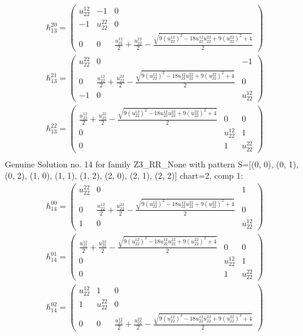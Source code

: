 \documentclass[a4paper, 11pt, twoside, onecolumn]{article}
\begin{document}
\begin{landscape}
\begin{gather*}
	 h_13^{20}=\begin{pmatrix}u^{12}_{22} & -1 & 0\\-1 & u^{22}_{22} & 0\\0 & 0 & \frac{u^{12}_{22}}{2} + \frac{u^{22}_{22}}{2} - \frac{\sqrt{9 \left(u^{12}_{22}\right)^{2} - 18 u^{12}_{22} u^{22}_{22} + 9 \left(u^{22}_{22}\right)^{2} + 4}}{2}\end{pmatrix}\\ 
	 h_13^{21}=\begin{pmatrix}u^{22}_{22} & 0 & -1\\0 & \frac{u^{12}_{22}}{2} + \frac{u^{22}_{22}}{2} - \frac{\sqrt{9 \left(u^{12}_{22}\right)^{2} - 18 u^{12}_{22} u^{22}_{22} + 9 \left(u^{22}_{22}\right)^{2} + 4}}{2} & 0\\-1 & 0 & u^{12}_{22}\end{pmatrix}\\ 
	 h_13^{22}=\begin{pmatrix}\frac{u^{12}_{22}}{2} + \frac{u^{22}_{22}}{2} - \frac{\sqrt{9 \left(u^{12}_{22}\right)^{2} - 18 u^{12}_{22} u^{22}_{22} + 9 \left(u^{22}_{22}\right)^{2} + 4}}{2} & 0 & 0\\0 & u^{12}_{22} & 1\\0 & 1 & u^{22}_{22}\end{pmatrix}\\ 
\end{gather*} 
Genuine Solution no. 14 for family Z3_RR_None with pattern S=[(0, 0), (0, 1), (0, 2), (1, 0), (1, 1), (1, 2), (2, 0), (2, 1), (2, 2)] chart=2, comp 1: 
\begin{gather*} 
	 h_14^{00}=\begin{pmatrix}u^{22}_{22} & 0 & 1\\0 & \frac{u^{12}_{22}}{2} + \frac{u^{22}_{22}}{2} - \frac{\sqrt{9 \left(u^{12}_{22}\right)^{2} - 18 u^{12}_{22} u^{22}_{22} + 9 \left(u^{22}_{22}\right)^{2} + 4}}{2} & 0\\1 & 0 & u^{12}_{22}\end{pmatrix}\\ 
	 h_14^{01}=\begin{pmatrix}\frac{u^{12}_{22}}{2} + \frac{u^{22}_{22}}{2} - \frac{\sqrt{9 \left(u^{12}_{22}\right)^{2} - 18 u^{12}_{22} u^{22}_{22} + 9 \left(u^{22}_{22}\right)^{2} + 4}}{2} & 0 & 0\\0 & u^{12}_{22} & 1\\0 & 1 & u^{22}_{22}\end{pmatrix}\\ 
	 h_14^{02}=\begin{pmatrix}u^{12}_{22} & 1 & 0\\1 & u^{22}_{22} & 0\\0 & 0 & \frac{u^{12}_{22}}{2} + \frac{u^{22}_{22}}{2} - \frac{\sqrt{9 \left(u^{12}_{22}\right)^{2} - 18 u^{12}_{22} u^{22}_{22} + 9 \left(u^{22}_{22}\right)^{2} + 4}}{2}\end{pmatrix}\\ 

\end{gather*}
\end{landscape}
\end{document}
